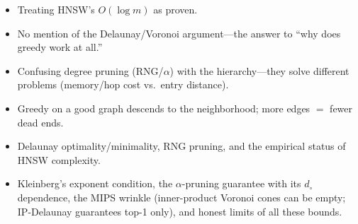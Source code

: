\begin{interviewq}
\redflags
\begin{itemize}
    \item Treating HNSW's $O(\log m)$ as proven.
    \item No mention of the Delaunay/Voronoi argument---the answer to ``why does greedy work at all.''
    \item Confusing degree pruning (RNG/$\alpha$) with the hierarchy---they solve different problems (memory/hop cost vs.\ entry distance).
\end{itemize}


\goodgreat
\begin{itemize}
    \item {} Greedy on a good graph descends to the neighborhood; more edges $=$ fewer dead ends.
    \item {} Delaunay optimality/minimality, RNG pruning, and the empirical status of HNSW complexity.
    \item {} Kleinberg's exponent condition, the $\alpha$-pruning guarantee with its $d_\circ$ dependence, the MIPS wrinkle (inner-product Voronoi cones can be empty; IP-Delaunay guarantees top-1 only), and honest limits of all these bounds.
\end{itemize}

\end{interviewq}



